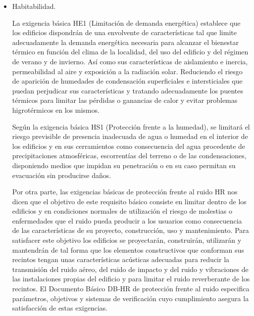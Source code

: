 \begin{itemize}
Asimismo, el Documento Básico DB-SI especifica parámetros, objetivos y procedimientos cuyo cumplimiento asegura la satisfacción de las exigencias básicas y la superación de los niveles mínimos de calidad propios del requisito básico de seguridad en caso de incendio. Excepto en el caso de los edificios, establecimientos y zonas de uso industrial o los que les sea de aplicación el Reglamento de Seguridad contra Incendios en los Establecimientos Industriales, en los cuales las exigencias básicas se cumplen mediante dicha aplicación.

    \item Habitabilidad.
    
La exigencia básica HE1 (Limitación de demanda energética) establece que los edificios dispondrán de una envolvente de características tal que limite adecuadamente la demanda energética necesaria para alcanzar el bienestar térmico en función del clima de la localidad, del uso del edificio y del régimen de verano y de invierno. Así como sus características de aislamiento e inercia, permeabilidad al aire y exposición a la radiación solar. Reduciendo el riesgo de aparición de humedades de condensación superficiales e intersticiales que puedan perjudicar sus características y tratando adecuadamente los puentes térmicos para limitar las pérdidas o ganancias de calor y evitar problemas higrotérmicos en los mismos.  

Según la exigencia básica HS1 (Protección frente a la humedad), se limitará el riesgo previsible de presencia inadecuada de agua o humedad en el interior de los edificios y en sus cerramientos como consecuencia del agua procedente de precipitaciones atmosféricas, escorrentías del terreno o de las condensaciones, disponiendo medios que impidan su penetración o en su caso permitan su evacuación sin producirse daños.  

Por otra parte, las exigencias básicas de protección frente al ruido HR nos dicen que el objetivo de este requisito básico consiste en limitar dentro de los edificios y en condiciones normales de utilización el riesgo de molestias o enfermedades que el ruido pueda producir a los usuarios como consecuencia de las características de su proyecto, construcción, uso y mantenimiento. Para satisfacer este objetivo los edificios se proyectarán, construirán, utilizarán y mantendrán de tal forma que los elementos constructivos que conforman sus recintos tengan unas características acústicas adecuadas para reducir la transmisión del ruido aéreo, del ruido de impacto y del ruido y vibraciones de las instalaciones propias del edificio y para limitar el ruido reverberante de los recintos. El Documento Básico DB-HR de protección frente al ruido especifica parámetros, objetivos y sistemas de verificación cuyo cumplimiento asegura la satisfacción de estas exigencias.  


\end{itemize}

